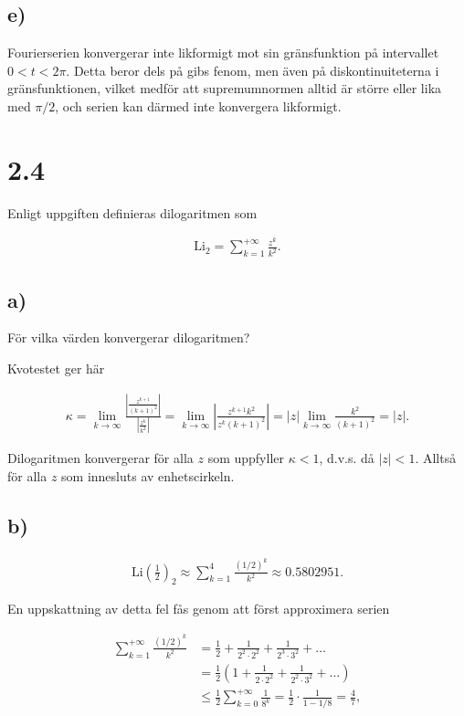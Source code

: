 \documentclass[a4paper]{article}
\begin{document}
\subsection*{e)}

Fourierserien konvergerar inte likformigt mot sin gränsfunktion på intervallet
$0 < t < 2\pi$. Detta beror dels på gibs fenom, men även på diskontinuiteterna i
gränsfunktionen, vilket medför att supremumnormen alltid är större eller lika
med $\pi/2$, och serien kan därmed inte konvergera likformigt.

\section*{2.4}

Enligt uppgiften definieras dilogaritmen som

\begin{align*}
  \text{Li}_2 = \sum_{k=1}^{+\infty}\frac{z^k}{k^2}.
\end{align*}

\subsection*{a)}

För vilka värden konvergerar dilogaritmen?

Kvotestet ger här

\begin{align*}
  \kappa = \lim_{k\to\infty}\frac{\left|\frac{z^{k+1}}{(k+1)^2}\right|}{\left|\frac{z^k}{k^2}\right|} = \lim_{k\to\infty}\left| \frac{z^{k+1}k^2}{z^k(k+1)^2}\right| = |z|\lim_{k\to\infty}\frac{k^2}{(k+1)^2} = |z|.
\end{align*}

\noindent Dilogaritmen konvergerar för alla $z$ som uppfyller $\kappa < 1$, d.v.s. då $|z|
< 1$. Alltså för alla $z$ som innesluts av enhetscirkeln.

\subsection*{b)}

\begin{align*}
  \text{Li}\left(\frac{1}{2}\right)_2 \approx \sum_{k=1}^4\frac{(1/2)^k}{k^2} \approx 0.5802951.
\end{align*}

\noindent En uppskattning av detta fel fås genom att först approximera serien

\begin{align*}
	\sum_{k=1}^{+\infty}\frac{(1/2)^k}{k^2} &= \frac 12 + \frac{1}{2^2\cdot2^2} + \frac{1}{2^3\cdot3^2} + \ldots\\
										 &= \frac 12 \left( 1 + \frac{1}{2\cdot2^2} + \frac{1}{2^2\cdot3^2} + \ldots \right)\\
			  &\leq \frac 12 \sum_{k=0}^{+\infty}\frac{1}{8^k} = \frac 12 \cdot \frac{1}{1 - 1/8} = \frac 47,
\end{align*}
\end{document}
